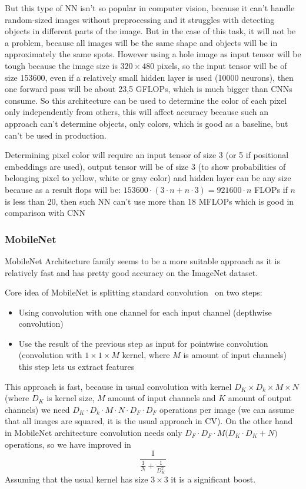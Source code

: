 But this type of NN isn't so popular in computer vision, because it can't handle 
random-sized images without preprocessing and it struggles with detecting objects 
in different parts of the image. But in the case of this task, it will not be a problem, 
because all images will be the same shape and objects will be in approximately the same spots.
However using a hole image as input tensor will be tough because the image size is $320\times480$ pixels,
so the input tensor will be of size 153600, even if a relatively small hidden layer is used (10000 neurons), 
then one forward pass will be about 23,5 GFLOPs, which is much bigger than CNNs consume.
So this architecture can be used to determine the color of each pixel only independently from others,
this will affect accuracy because such an approach can't determine objects, only colors, which is
good as a baseline, but can't be used in production. 

Determining pixel color will require an input tensor of size 3 (or 5 if positional embeddings are used), 
output tensor will be of size 3 (to show probabilities of belonging pixel to yellow, white or gray color)
and hidden layer can be any size because as a result flops will be: $153600 \cdot( 3 \cdot n + n \cdot 3) = 921600 \cdot n$ FLOPs
if $n$ is less than 20, then such NN can't use more than 18 MFLOPs which is good in comparison with CNN

\subsubsection{MobileNet}
MobileNet Architecture family seems to be a more suitable approach 
as it is relatively fast and has pretty good accuracy on the ImageNet dataset.

Core idea of MobileNet\cite{mobileNet} is splitting standard convolution~\cite{cnn} on two steps:
\begin{itemize}
    \item Using convolution with one channel for each input channel (depthwise convolution)
    \item Use the result of the previous step as input for pointwise convolution 
    (convolution with $1\times 1 \times M$ kernel, where $M$ is amount of input channels) 
    \- this step lets us extract features
\end{itemize}
This approach is fast, because in usual convolution with kernel $D_K\times D_k\times M \times N$ 
(where $D_K$ is kernel size, $M$ \- amount of input channels and $K$ \- amount of output
channels) we need $D_K\cdot D_k\cdot M \cdot N \cdot D_F \cdot D_F$ operations per image 
(we can assume that all images are squared, it is the usual approach in CV). On the other hand in 
MobileNet architecture convolution needs only $D_F\cdot D_F \cdot M \big(D_K \cdot D_K + N)$ 
operations, so we have improved in 
\[ \frac{1}{\frac{1}{N} + \frac{1}{D_K^2}}\] 
Assuming that the usual kernel has size $3\times 3$ it is a significant boost.

